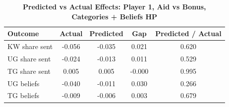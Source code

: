 \begin{table}[!htbp]
\centering
\caption{\textbf{Predicted vs Actual Effects: Player 1, Aid vs Bonus, Categories + Beliefs HP}}
\label{tab:cats_hp_aid_vs_bonus_fullpooled_p1_fit}
\begin{tabular}{lcccc}
\toprule
Outcome & Actual & Predicted & Gap & Predicted / Actual \\
\midrule
KW share sent & -0.056 & -0.035 & 0.021 & 0.620 \\
UG share sent & -0.024 & -0.013 & 0.011 & 0.529 \\
TG share sent & 0.005 & 0.005 & -0.000 & 0.995 \\
UG beliefs & -0.040 & -0.011 & 0.030 & 0.266 \\
TG beliefs & -0.009 & -0.006 & 0.003 & 0.679 \\
\bottomrule
\end{tabular}
\end{table}
